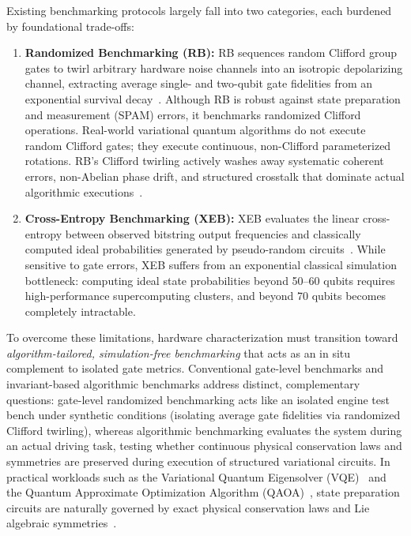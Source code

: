 \documentclass[aps,pra,reprint,superscriptaddress,floatfix,nofootinbib]{revtex4-2}
\begin{document}
Existing benchmarking protocols largely fall into two categories, each burdened by foundational trade-offs:
\begin{enumerate}
    \item \textbf{Randomized Benchmarking (RB):} RB sequences random Clifford group gates to twirl arbitrary hardware noise channels into an isotropic depolarizing channel, extracting average single- and two-qubit gate fidelities from an exponential survival decay~\cite{Magesan2011, Knill2008}. Although RB is robust against state preparation and measurement (SPAM) errors, it benchmarks randomized Clifford operations. Real-world variational quantum algorithms do not execute random Clifford gates; they execute continuous, non-Clifford parameterized rotations. RB's Clifford twirling actively washes away systematic coherent errors, non-Abelian phase drift, and structured crosstalk that dominate actual algorithmic executions~\cite{BlumeKohout2017, Proctor2019, Proctor2017}.
    \item \textbf{Cross-Entropy Benchmarking (XEB):} XEB evaluates the linear cross-entropy between observed bitstring output frequencies and classically computed ideal probabilities generated by pseudo-random circuits~\cite{Boixo2018, Arute2019}. While sensitive to gate errors, XEB suffers from an exponential classical simulation bottleneck: computing ideal state probabilities beyond 50--60 qubits requires high-performance supercomputing clusters, and beyond 70 qubits becomes completely intractable.
\end{enumerate}

To overcome these limitations, hardware characterization must transition toward \emph{algorithm-tailored, simulation-free benchmarking} that acts as an in situ complement to isolated gate metrics. Conventional gate-level benchmarks and invariant-based algorithmic benchmarks address distinct, complementary questions: gate-level randomized benchmarking acts like an isolated engine test bench under synthetic conditions (isolating average gate fidelities via randomized Clifford twirling), whereas algorithmic benchmarking evaluates the system during an actual driving task, testing whether continuous physical conservation laws and symmetries are preserved during execution of structured variational circuits. In practical workloads such as the Variational Quantum Eigensolver (VQE)~\cite{Peruzzo2014, McClean2016} and the Quantum Approximate Optimization Algorithm (QAOA)~\cite{Farhi2014, Hadfield2019}, state preparation circuits are naturally governed by exact physical conservation laws and Lie algebraic symmetries~\cite{BonetMonroig2018, McArdle2019, Sagastizabal2019}.
\end{document}
